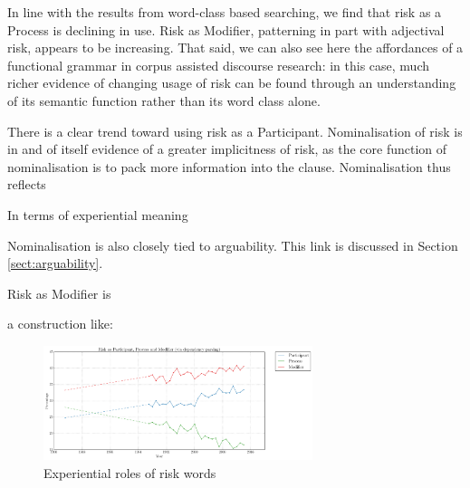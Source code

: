     In line with the results from word-class based searching, we find that risk as a Process is declining in use. Risk as Modifier, patterning in part with adjectival risk, appears to be increasing. That said, we can also see here the affordances of a functional grammar in corpus assisted discourse research: in this case, much richer evidence of changing usage of risk can be found through an understanding of its semantic function rather than its word class alone.


    There is a clear trend toward using risk as a Participant.
     Nominalisation of risk is in and of itself evidence of a greater implicitness of risk, as the core function of nominalisation is to pack more information into the clause. Nominalisation thus reflects 


    

    In terms of experiential meaning

    Nominalisation is also closely tied to arguability. This link is discussed in Section \ref{sect:arguability}.


    Risk as Modifier is

    a construction like:









            

            \begin{figure}[htb!]
            \centering
            \includegraphics[width=0.7\textwidth]{../images/risk-as-participant-process-and-modifier-via-dependency-parsing.png}
           \caption{Experiential roles of risk words}
                \label{fig:funcrole}
            \end{figure}

